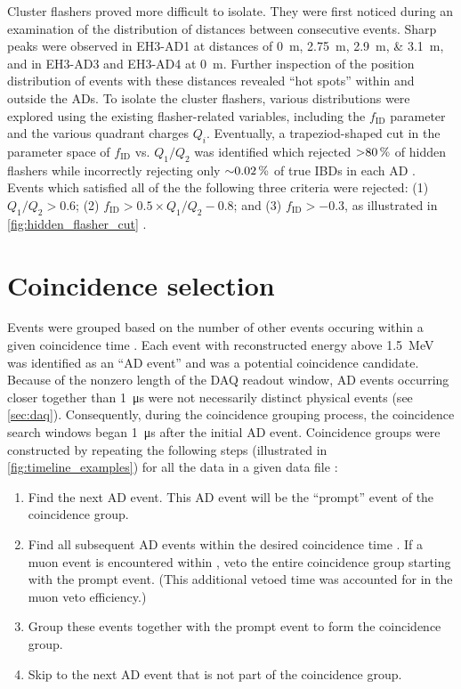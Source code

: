 Cluster flashers proved more difficult to isolate.
They were first noticed during an examination of the distribution of distances
between consecutive events.
Sharp peaks were observed in EH3-AD1 at distances of \SIlist{0;2.75;2.9;3.1}{\m},
and in EH3-AD3 and EH3-AD4 at \SI{0}{\m}.
Further inspection of the position distribution of events with these distances
revealed ``hot spots'' within and outside the ADs.
To isolate the cluster flashers,
various distributions were explored using the existing flasher-related variables,
including the $f_{\text{ID}}$ parameter and the various quadrant charges $Q_i$.
Eventually, a trapeziod-shaped cut in the parameter space of
$f_{\text{ID}}$ vs. $Q_1/Q_2$ was identified which rejected
$\SI{>80}{\percent}$ of hidden flashers while incorrectly rejecting only
$\SI{\sim0.02}{\percent}$ of true IBDs in each AD \cite{nh2021technote}.
Events which satisfied all of the the following three criteria were rejected:
(1) $Q_1/Q_2 > 0.6$; (2) $f_{\text{ID}} > 0.5 \times Q_1/Q_2 - 0.8$;
and (3) $f_{\text{ID}} > -0.3$,
as illustrated in \cref{fig:hidden_flasher_cut}
\cite{beda_resid_flasher_dt,flashers_jinjing}.

\section{Coincidence selection}
\label{sec:coincidence}

Events were grouped based on the number of other events
occuring within a given coincidence time \tc.
Each event with reconstructed energy above \SI{1.5}{\mega\electronvolt}
was identified as an ``AD event''
and was a potential coincidence candidate.
Because of the nonzero length of the DAQ readout window,
AD events occurring closer together than \SI{1}{\micro\second}
were not necessarily distinct physical events (see \cref{sec:daq}).
Consequently, during the coincidence grouping process,
the coincidence search windows began \SI{1}{\micro\second}
after the initial AD event.
Coincidence groups were constructed by repeating the following steps
(illustrated in \cref{fig:timeline_examples})
for all the data in a given data file \cite{thucoinc2015}:

\begin{enumerate}
    \item Find the next AD event.
        This AD event will be the ``prompt'' event of the coincidence group.
    \item Find all subsequent AD events within the desired coincidence time \tc.
        If a muon event is encountered within \tc,
        veto the entire coincidence group starting with the prompt event.
        (This additional vetoed time was accounted for in the muon veto efficiency.)
    \item Group these events together with the prompt event
        to form the coincidence group.
    \item Skip to the next AD event that is not part of the coincidence group.
\end{enumerate}

